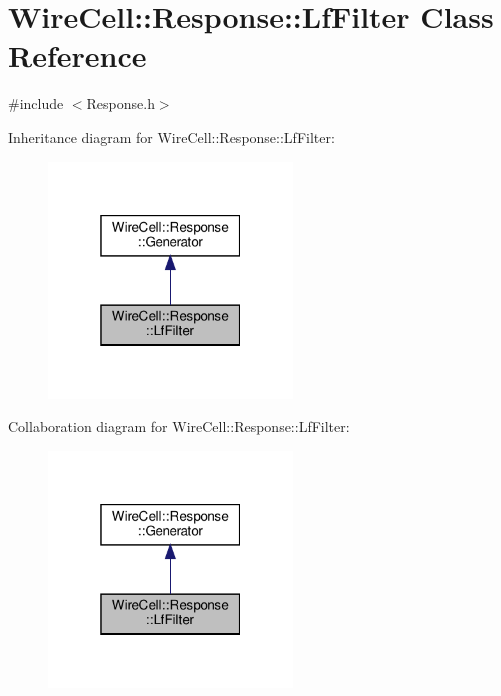 \hypertarget{class_wire_cell_1_1_response_1_1_lf_filter}{}\section{Wire\+Cell\+:\+:Response\+:\+:Lf\+Filter Class Reference}
\label{class_wire_cell_1_1_response_1_1_lf_filter}


{\ttfamily \#include $<$Response.\+h$>$}



Inheritance diagram for Wire\+Cell\+:\+:Response\+:\+:Lf\+Filter\+:
\nopagebreak
\begin{figure}[H]
\begin{center}
\leavevmode
\includegraphics[width=184pt]{class_wire_cell_1_1_response_1_1_lf_filter__inherit__graph}
\end{center}
\end{figure}


Collaboration diagram for Wire\+Cell\+:\+:Response\+:\+:Lf\+Filter\+:
\nopagebreak
\begin{figure}[H]
\begin{center}
\leavevmode
\includegraphics[width=184pt]{class_wire_cell_1_1_response_1_1_lf_filter__coll__graph}
\end{center}
\end{figure}
